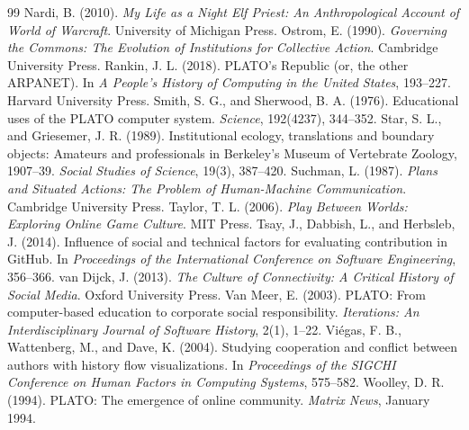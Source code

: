 \documentclass[11pt]{article}
\theoremstyle{remark}
\begin{document}
\begin{thebibliography}{99}
 Nardi, B. (2010). \emph{My Life as a Night Elf Priest: An Anthropological Account of World of Warcraft}. University of Michigan Press.
 Ostrom, E. (1990). \emph{Governing the Commons: The Evolution of Institutions for Collective Action}. Cambridge University Press.
 Rankin, J. L. (2018). PLATO's Republic (or, the other ARPANET). In \emph{A People's History of Computing in the United States}, 193--227. Harvard University Press.
 Smith, S. G., and Sherwood, B. A. (1976). Educational uses of the PLATO computer system. \emph{Science}, 192(4237), 344--352.
 Star, S. L., and Griesemer, J. R. (1989). Institutional ecology, translations and boundary objects: Amateurs and professionals in Berkeley's Museum of Vertebrate Zoology, 1907--39. \emph{Social Studies of Science}, 19(3), 387--420.
 Suchman, L. (1987). \emph{Plans and Situated Actions: The Problem of Human-Machine Communication}. Cambridge University Press.
 Taylor, T. L. (2006). \emph{Play Between Worlds: Exploring Online Game Culture}. MIT Press.
 Tsay, J., Dabbish, L., and Herbsleb, J. (2014). Influence of social and technical factors for evaluating contribution in GitHub. In \emph{Proceedings of the International Conference on Software Engineering}, 356--366.
 van Dijck, J. (2013). \emph{The Culture of Connectivity: A Critical History of Social Media}. Oxford University Press.
 Van Meer, E. (2003). PLATO: From computer-based education to corporate social responsibility. \emph{Iterations: An Interdisciplinary Journal of Software History}, 2(1), 1--22.
 Vi\'egas, F. B., Wattenberg, M., and Dave, K. (2004). Studying cooperation and conflict between authors with history flow visualizations. In \emph{Proceedings of the SIGCHI Conference on Human Factors in Computing Systems}, 575--582.
 Woolley, D. R. (1994). PLATO: The emergence of online community. \emph{Matrix News}, January 1994.
\end{thebibliography}
\end{document}
